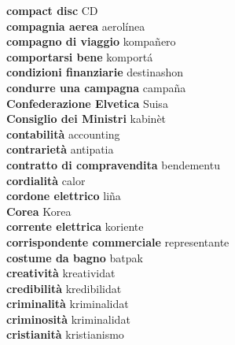\textbf{ compact disc  } CD \\
\textbf{ compagnia aerea  } aerolínea \\
\textbf{ compagno di viaggio  } kompañero \\
\textbf{ comportarsi bene  } komportá \\
\textbf{ condizioni finanziarie  } destinashon \\
\textbf{ condurre una campagna  } campaña \\
\textbf{ Confederazione Elvetica  } Suisa \\
\textbf{ Consiglio dei Ministri  } kabinèt \\
\textbf{ contabilità  } accounting \\
\textbf{ contrarietà  } antipatia \\
\textbf{ contratto di compravendita  } bendementu \\
\textbf{ cordialità  } calor \\
\textbf{ cordone elettrico  } liña \\
\textbf{ Corea  } Korea \\
\textbf{ corrente elettrica  } koriente \\
\textbf{ corrispondente commerciale  } representante \\
\textbf{ costume da bagno  } batpak \\
\textbf{ creatività  } kreatividat \\
\textbf{ credibilità  } kredibilidat \\
\textbf{ criminalità  } kriminalidat \\
\textbf{ criminosità  } kriminalidat \\
\textbf{ cristianità  } kristianismo \\
